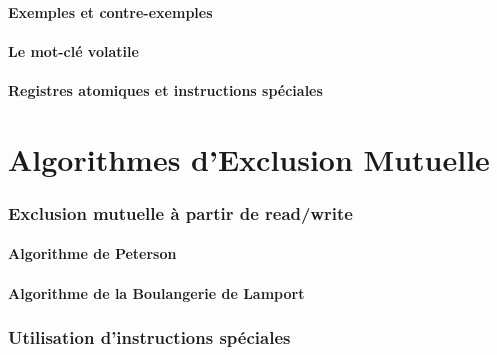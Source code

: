 \documentclass[9pt, handout]{beamer}
\begin{document}
\subsection{Exemples et contre-exemples}





 
\subsection{Le mot-clé volatile}


 
\subsection{Registres atomiques et instructions spéciales}



 
 
 
\part{Algorithmes d'Exclusion Mutuelle}
 
 
\section{Exclusion mutuelle à partir de read/write}
 
\subsection{Algorithme de Peterson}





 
\subsection{Algorithme de la Boulangerie de Lamport}


 
\section{Utilisation d'instructions spéciales}
 
\end{document}
